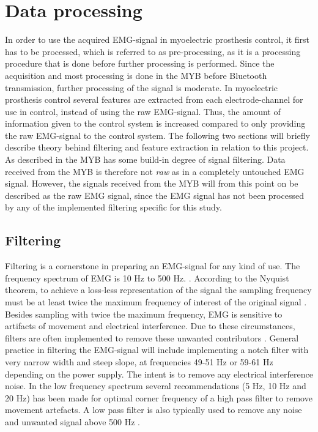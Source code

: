 \section{Data processing} \label{sec:BG:dataProcessing}


In order to use the acquired EMG-signal in myoelectric prosthesis control, it first has to be processed, which is referred to as pre-processing, as it is a processing procedure that is done before further processing is performed. Since the acquisition and most processing is done in the MYB before Bluetooth transmission, further processing of the signal is moderate. In myoelectric prosthesis control several features are extracted from each electrode-channel for use in control, instead of using the raw EMG-signal. Thus, the amount of information given to the control system is increased compared to only providing the raw EMG-signal to the control system. The following two sections will briefly describe theory behind filtering and feature extraction in relation to this project. 
As described in  the MYB has some build-in degree of signal filtering. Data received from the MYB is therefore not \textit{raw} as in a completely untouched EMG signal. However, the signals received from the MYB will from this point on be described as the raw EMG signal, since the EMG signal has not been processed by any of the implemented filtering specific for this study.


\subsection{Filtering} \label{sub:BG:filtering} %

Filtering is a cornerstone in preparing an EMG-signal for any kind of use. The frequency spectrum of EMG is 10 Hz to 500 Hz. \cite{Cram2012}. According to the Nyquist theorem, to achieve a loss-less representation of the signal the sampling frequency must be at least twice the maximum frequency of interest of the original signal \cite{Pozzo2004}. Besides sampling with twice the maximum frequency, EMG is sensitive to artifacts of movement and electrical interference. Due to these circumstances, filters are often implemented to remove these unwanted contributors \cite{DeLuca2010}. 
General practice in filtering the EMG-signal will include implementing a notch filter with very narrow width and steep slope, at frequencies 49-51 Hz or 59-61 Hz depending on the power supply. The intent is to remove any electrical interference noise. In the low frequency spectrum several recommendations (5 Hz, 10 Hz and 20 Hz) has been made for optimal corner frequency of a high pass filter to remove movement artefacts. A low pass filter is also typically used to remove any noise and unwanted signal above 500 Hz \cite{Cram2012}. 

